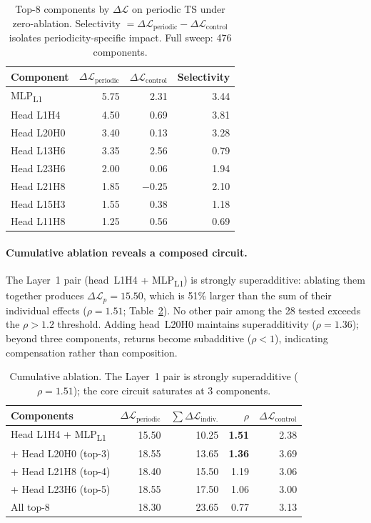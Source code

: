 \documentclass{article}
\begin{document}
\begin{table}[h]
\centering
\caption{Top-8 components by $\Delta\mathcal{L}$ on periodic TS under zero-ablation. Selectivity $= \Delta\mathcal{L}_\text{periodic} - \Delta\mathcal{L}_\text{control}$ isolates periodicity-specific impact. Full sweep: 476 components.}
\label{tab:ablation_top}
\begin{tabular}{lrrr}
\toprule
Component & $\Delta\mathcal{L}_\text{periodic}$ & $\Delta\mathcal{L}_\text{control}$ & Selectivity \\
\midrule
MLP\textsubscript{L1}   & 5.75 & 2.31 & 3.44 \\
Head L1H4               & 4.50 & 0.69 & 3.81 \\
Head L20H0              & 3.40 & 0.13 & 3.28 \\
Head L13H6              & 3.35 & 2.56 & 0.79 \\
Head L23H6              & 2.00 & 0.06 & 1.94 \\
Head L21H8              & 1.85 & $-0.25$ & 2.10 \\
Head L15H3              & 1.55 & 0.38 & 1.18 \\
Head L11H8              & 1.25 & 0.56 & 0.69 \\
\bottomrule
\end{tabular}
\end{table}

\paragraph{Cumulative ablation reveals a composed circuit.}
The Layer~1 pair (head~L1H4 + MLP\textsubscript{L1}) is strongly superadditive: ablating them together produces $\Delta\mathcal{L}_p = 15.50$, which is 51\% larger than the sum of their individual effects ($\rho = 1.51$; Table~\ref{tab:cumulative}). No other pair among the 28 tested exceeds the $\rho > 1.2$ threshold. Adding head~L20H0 maintains superadditivity ($\rho = 1.36$); beyond three components, returns become subadditive ($\rho < 1$), indicating compensation rather than composition.

\begin{table}[h]
\centering
\caption{Cumulative ablation. The Layer~1 pair is strongly superadditive ($\rho = 1.51$); the core circuit saturates at 3 components.}
\label{tab:cumulative}
\begin{tabular}{lrrrr}
\toprule
Components & $\Delta\mathcal{L}_\text{periodic}$ & $\sum \Delta\mathcal{L}_\text{indiv.}$ & $\rho$ & $\Delta\mathcal{L}_\text{control}$ \\
\midrule
Head L1H4 + MLP\textsubscript{L1} & 15.50 & 10.25 & \textbf{1.51} & 2.38 \\
+ Head L20H0 (top-3)              & 18.55 & 13.65 & \textbf{1.36} & 3.69 \\
+ Head L21H8 (top-4)              & 18.40 & 15.50 & 1.19 & 3.06 \\
+ Head L23H6 (top-5)              & 18.55 & 17.50 & 1.06 & 3.00 \\
All top-8                          & 18.30 & 23.65 & 0.77 & 3.13 \\
\bottomrule
\end{tabular}
\end{table}
\end{document}

